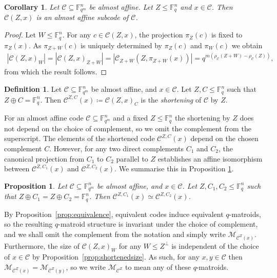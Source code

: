 \documentclass[a4paper,11pt,reqno]{article}
\newcommand{\F}{\mathbb{F}}
\newcommand{\M}{\mathcal{M}}
\newcommand{\C}{\mathcal{C}}
\theoremstyle{plain} \numberwithin{equation}{section}
\newtheorem{corollary}[theorem]{Corollary}
\newtheorem{proposition}[theorem]{Proposition}
\theoremstyle{definition}
\newtheorem{definition}[theorem]{Definition}
\begin{document}
\begin{corollary}
Let $\C\subseteq \F_{q^m}^n$ be almost affine. Let $Z\leq \F_q^n$ and $x\in \C$. Then $\C(Z,x)$ is an almost affine subcode of $\C$. \label{cor:shortened}
\end{corollary}
\begin{proof}
Let $W\leq \F_q^n$. For any $c\in \C(Z,x)$, the projection $\pi_Z(c)$ is fixed to $\pi_Z(x)$. As $\pi_{Z+W}(c)$ is uniquely determined by $\pi_Z(c)$ and $\pi_W(c)$ we obtain
\begin{align*}
    |\C(Z,x)_W| = |\C(Z,x)_{Z+W}| = |\C_{Z+W}(Z,\pi_{Z+W}(x))| = q^{m(\rho_\C(Z+W) - \rho_\C(Z))},
\end{align*}
from which the result follows.
\end{proof}




\begin{definition}\label{defn:shorten}
    Let $\C\subseteq \F_{q^m}^n$ be almost affine, and $x\in \C$. Let $Z,C\leq \F_q^n$ such that $Z\oplus C = \F_q^n$. Then $\C^{Z,C}(x)\coloneqq \C(Z,x)_{C}$ is the \emph{shortening} of $\C$ by $Z$.
\end{definition}


For an almost affine code $\C\subseteq \F_{q^m}^n$ and a fixed $Z\leq \F_q^n$ the shortening by $Z$ does not depend on the choice of complement, so we omit the complement from the superscript.
The elements of the shortened code $\C^{Z,C}(x)$ depend on the chosen complement $C$. However, for any two direct complements $C_1$ and $C_2$, the canonical projection from $C_1$ to $C_2$ parallel to $Z$ establishes an affine isomorphism between $\C^{Z,C_1}(x)$ and $\C^{Z,C_2}(x)$. We summarise this in Proposition \ref{prop:shorteninvariant}. %

\begin{proposition} \label{prop:shorteninvariant}
Let $\C\subseteq \F_{q^m}^n$ be almost affine, and $x\in \C$. Let $Z,C_1,C_2\leq \F_q^n$ such that $Z\oplus C_1 = Z\oplus C_2 = \F_q^n$. Then $\C^{Z,C_1}(x)\simeq \C^{Z,C_2}(x)$.
\end{proposition}

By Proposition~\ref{prop:equivalence}, equivalent codes induce equivalent $q$-matroids, so the resulting $q$-matroid structure is invariant under the choice of complement, and we shall omit the complement from the notation and simply write $\M_{\C^Z(x)}$. Furthermore, the size of $\C(Z,x)_W$ for any $W\leq Z^\perp$ is independent of the choice of $x\in \C$ by Proposition~\ref{prop:shortenedsize}. As such, for any $x,y\in \C$ then $\M_{\C^Z(x)} = \M_{\C^Z(y)}$, so we write $\M_{\C^Z}$ to mean any of these $q$-matroids.
\end{document}
